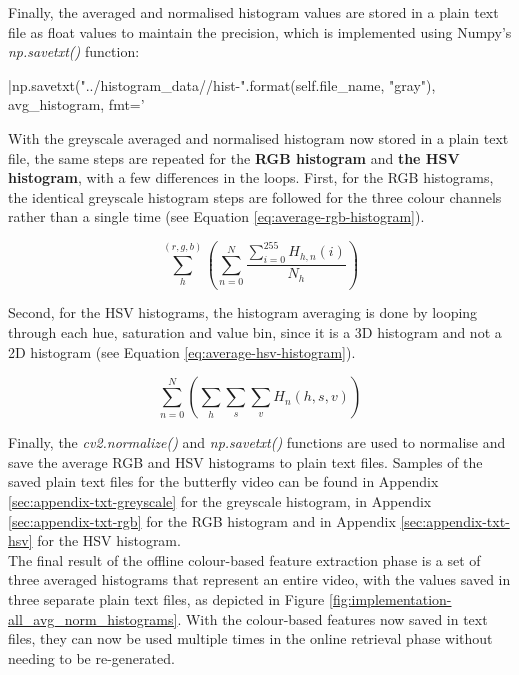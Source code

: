 Finally, the averaged and normalised histogram values are stored in a plain text file as float values to maintain the precision, which is implemented using Numpy's \textit{np.savetxt()} function:

|np.savetxt("../histogram_data/{}/hist-{}".format(self.file_name, "gray"), avg_histogram, fmt='%

With the greyscale averaged and normalised histogram now stored in a plain text file, the same steps are repeated for the \textbf{RGB histogram} and \textbf{the HSV histogram}, with a few differences in the loops. First, for the RGB histograms, the identical greyscale histogram steps are followed for the three colour channels rather than a single time (see Equation \ref{eq:average-rgb-histogram}).

\begin{equation}
\label{eq:average-rgb-histogram}
    \sum_{h}^{(r,g,b)} (\sum_{n=0}^{N} \frac{\sum_{i=0}^{255} H_{h,n}(i)}{N_h})
\end{equation}

Second, for the HSV histograms, the histogram averaging is done by looping through each hue, saturation and value bin, since it is a 3D histogram and not a 2D histogram (see Equation \ref{eq:average-hsv-histogram}).

\begin{equation}
\label{eq:average-hsv-histogram}
    \sum_{n=0}^{N}(\sum_h \sum_s \sum_v H_n(h,s,v))
\end{equation}

Finally, the \textit{cv2.normalize()} and \textit{np.savetxt()} functions are used to normalise and save the average RGB and HSV histograms to plain text files. Samples of the saved plain text files for the butterfly video can be found in Appendix \ref{sec:appendix-txt-greyscale} for the greyscale histogram, in Appendix \ref{sec:appendix-txt-rgb} for the RGB histogram and in Appendix \ref{sec:appendix-txt-hsv} for the HSV histogram.\\

The final result of the offline colour-based feature extraction phase is a set of three averaged histograms that represent an entire video, with the values saved in three separate plain text files, as depicted in Figure \ref{fig:implementation-all_avg_norm_histograms}. With the colour-based features now saved in text files, they can now be used multiple times in the online retrieval phase without needing to be re-generated.

